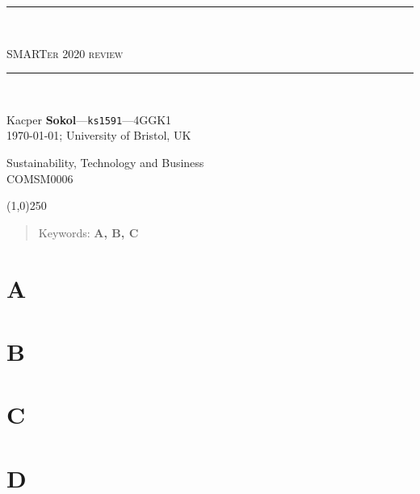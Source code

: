 \documentclass[11pt]{article}
\newcommand{\HRule}{\rule{\linewidth}{0.5mm}}
\begin{document}
\vspace*{\fill}
\begin{center}
    \begin{large}
    {\HRule \\[0.2cm]}
    \textsc{\Huge SMARTer 2020 review}
    {\HRule \\[0.3cm]}
    \end{large}

    \begin{minipage}{ 0.49\textwidth }
        \begin{flushleft}
            Kacper \textbf{Sokol}---\texttt{ks1591}---4GGK1\\
            \today; University of Bristol, UK
        \end{flushleft}
    \end{minipage}
    \begin{minipage}{ 0.49\textwidth }
        \begin{flushright}
            {Sustainability, Technology and Business\\
             COMSM0006\\[0.3cm]}
        \end{flushright}
    \end{minipage}
\end{center}

\vspace*{3cm}

\begin{center}
  \line(1,0){250}
\end{center}

\begin{abstract}
  \lipsum[5]
  \begin{center}
    Keywords: \textbf{A, B, C}
  \end{center}
\end{abstract}
\vspace*{\fill}

\thispagestyle{empty}
\newpage
\tableofcontents

\thispagestyle{empty}
\newpage
\setcounter{page}{1}

\section{A}
\lipsum[1]
\section{B}
\lipsum[2]
\section{C}
\lipsum[3]
\section{D}
\lipsum[4]
\end{document}
